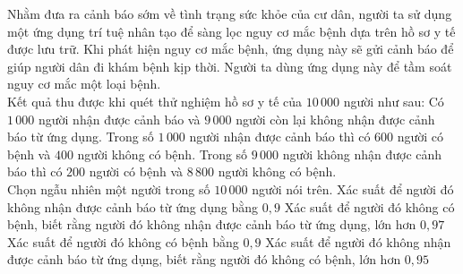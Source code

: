 \begin{ex}%
	Nhằm đưa ra cảnh báo sớm về tình trạng sức khỏe của cư dân, người ta sử dụng một ứng dụng trí tuệ nhân tạo để sàng lọc nguy cơ mắc bệnh dựa trên hồ sơ y tế được lưu trữ. Khi phát hiện nguy cơ mắc bệnh, ứng dụng này sẽ gửi cảnh báo để giúp người dân đi khám bệnh kịp thời. Người ta dùng ứng dụng này để tầm soát nguy cơ mắc một loại bệnh.\\
	Kết quả thu được khi quét thử nghiệm hồ sơ y tế của $10\,000$ người như sau: Có $1\,000$ người nhận được cảnh báo và $9\,000$ người còn lại không nhận được cảnh báo từ ứng dụng. Trong số $1\,000$ người nhận được cảnh báo thì có $600$ người có bệnh và $400$ người không có bệnh. Trong số $9\,000$ người không nhận được cảnh báo thì có $200$ người có bệnh và $8\,800$ người không có bệnh.\\
	Chọn ngẫu nhiên một người trong số $10\,000$ người nói trên.
	\choiceTF
		{\True Xác suất để người đó không nhận được cảnh báo từ ứng dụng bằng $0{,}9$}
		{\True Xác suất để người đó không có bệnh, biết rằng người đó không nhận được cảnh báo từ ứng dụng, lớn hơn $0{,}97$}
		{Xác suất để người đó không có bệnh bằng $0{,}9$}
		{\True Xác suất để người đó không nhận được cảnh báo từ ứng dụng, biết rằng người đó không có bệnh, lớn hơn $0{,}95$}
\end{ex}
